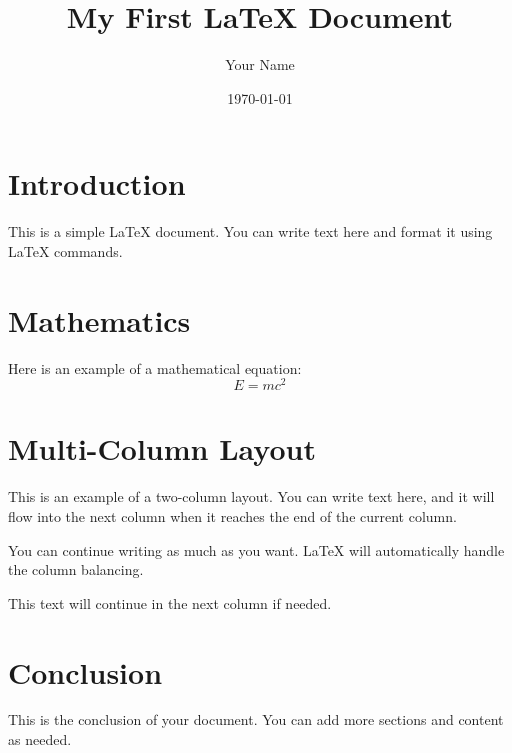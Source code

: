 \documentclass{article}  %
\title{My First LaTeX Document}  %
\author{Your Name}  %
\date{\today}  %
\begin{document}

\maketitle  %

\section{Introduction}  %
This is a simple LaTeX document. You can write text here and format it using LaTeX commands.

\section{Mathematics}  %
Here is an example of a mathematical equation:
\begin{equation}
    E = mc^2
\end{equation}

\section{Multi-Column Layout}
\begin{multicols}{2}
This is an example of a two-column layout. You can write text here, and it will flow into the next column when it reaches the end of the current column.

You can continue writing as much as you want. LaTeX will automatically handle the column balancing.

\columnbreak  %

This text will continue in the next column if needed.
\end{multicols}

\section{Conclusion}
This is the conclusion of your document. You can add more sections and content as needed.
\end{document}
